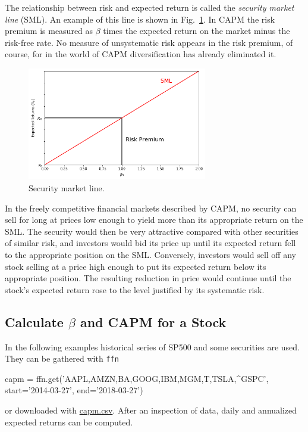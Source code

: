 The relationship between risk and expected return is called the \emph{security market line} (SML). An example of this line is shown in Fig.~\ref{fig:sel}. %
In CAPM the risk premium is measured as $\beta$ times the expected return on the market minus the risk-free rate. No measure of unsystematic risk appears in the risk premium, of course, for in the world of CAPM diversification has already eliminated it.

\begin{figure}[htb]
	\centering
	\includegraphics[width=0.7\textwidth]{figures/sel}
	\caption{Security market line.}
	\label{fig:sel}
\end{figure}

In the freely competitive financial markets described by CAPM, no security can sell for long at prices low enough to yield more than its appropriate return on the SML. The security would then be very attractive compared with other securities of similar risk, and investors would bid its price up until its expected return fell to the appropriate position on the SML. Conversely, investors would sell off any stock selling at a price high enough to put its expected return below its appropriate position. The resulting reduction in price would continue until the stock’s expected return rose to the level justified by its systematic risk.

\subsection{Calculate $\beta$ and CAPM for a Stock}

In the following examples historical series of SP500 and some securities are used. They can be gathered with \texttt{ffn}

\begin{ipython}
capm = ffn.get('AAPL,AMZN,BA,GOOG,IBM,MGM,T,TSLA,^GSPC',
               start='2014-03-27', end='2018-03-27')
\end{ipython}
\noindent
or downloaded with \href{https://raw.githubusercontent.com/matteosan1/finance_course/develop/libro/input_files/capm.csv}{capm.csv}.
After an inspection of data, daily and annualized expected returns can be computed.

